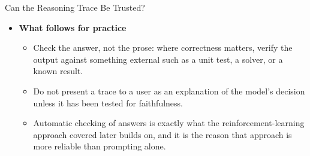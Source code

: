 \begin{frame}[allowframebreaks]{Can the Reasoning Trace Be Trusted?}
\begin{itemize}
\begin{itemize}
            \item The pathology runs both ways: overthinking on the easy end, and giving up early on the hard end.
        \end{itemize}
        \item \textbf{What follows for practice}
        \begin{itemize}
            \item Check the answer, not the prose: where correctness matters, verify the output against something external such as a unit test, a solver, or a known result.
            \item Do not present a trace to a user as an explanation of the model's decision unless it has been tested for faithfulness.
            \item Automatic checking of answers is exactly what the reinforcement-learning approach covered later builds on, and it is the reason that approach is more reliable than prompting alone.
        \end{itemize}
    \end{itemize}
\end{frame}
